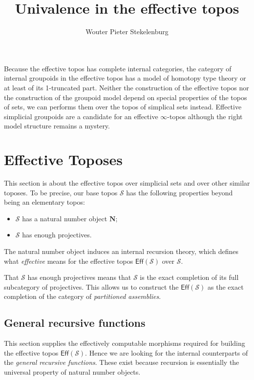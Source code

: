 \documentclass{amsart}
\title{Univalence in the effective topos}
\author[W. P. Stekelenburg]{Wouter Pieter Stekelenburg}
\theoremstyle{plain}
\theoremstyle{definition}
\newcommand\hide[1]{}
\newcommand\cat\mathcal
\newcommand\N{\mathbf N}
\begin{document}
\maketitle

\hide{In plaats van de effectieve topos zo algemeen te ontwikkelen zouden we misschien beter kunnen kijken naar interne simplicial objecten van de gewone effective topos. De theorie van interne sheaves staat gelukkig in 'Sheaves...'

}

Because the effective topos has complete internal categories, the category of internal groupoids in the effective topos has a model of homotopy type theory or at least of its 1-truncated part. Neither the construction of the effective topos nor the construction of the groupoid model depend on special properties of the topos of sets, we can performs them over the topos of simplical sets instead. Effective simplicial groupoids are a candidate for an effective $\infty$-topos although the right model structure remains a mystery.

\section{Effective Toposes}
This section is about the effective topos over simplicial sets and over other similar toposes. To be precise, our base topos $\cat S$ has the following properties beyond being an elementary topos:
\begin{itemize}
\item $\cat S$ has a natural number object $\N$;
\item $\cat S$ has enough projectives.
\end{itemize}

\newcommand\Eff{\mathsf{Eff}}
The natural number object induces an internal recursion theory, which defines what \emph{effective} means for the effective topos $\Eff(\cat S)$ over $\cat S$. %

That $\cat S$ has enough projectives means that $\cat S$ is the exact completion of its full subcategory of projectives. This allows us to construct the $\Eff(\cat S)$ as the exact completion of the category of \emph{partitioned assemblies}. %

\subsection{General recursive functions}
This section supplies the effectively computable morphisms required for building the effective topos $\Eff(\cat S)$. Hence we are looking for the internal counterparts of the \emph{general recursive functions}. These exist because recursion is essentially the universal property of natural number objects.
\end{document}

